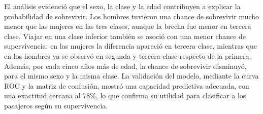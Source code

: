\documentclass[
  spanish,
  11pt,
  letterpaper,
  DIV=11,
  numbers=noendperiod]{scrartcl}
\begin{document}
El análisis evidenció que el sexo, la clase y la edad contribuyen a
explicar la probabilidad de sobrevivir. Los hombres tuvieron una chance
de sobrevivir mucho menor que las mujeres en las tres clases, aunque la
brecha fue menor en tercera clase. Viajar en una clase inferior también
se asoció con una menor chance de supervivencia: en las mujeres la
diferencia apareció en tercera clase, mientras que en los hombres ya se
observó en segunda y tercera clase respecto de la primera. Además, por
cada cinco años más de edad, la chance de sobrevivir disminuyó, para el
mismo sexo y la misma clase. La validación del modelo, mediante la curva
ROC y la matriz de confusión, mostró una capacidad predictiva adecuada,
con una exactitud cercana al 78\%, lo que confirma su utilidad para
clasificar a los pasajeros según su supervivencia.
\end{document}
